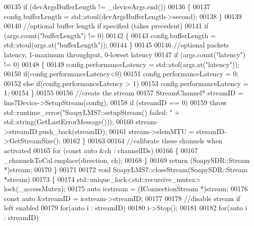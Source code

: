 \begin{DoxyCode}
00135         \textcolor{keywordflow}{if} (devArgsBufferLength != \_deviceArgs.end())
00136         \{
00137             config.bufferLength = std::stoul(devArgsBufferLength->second);
00138         \}
00139 
00140         \textcolor{comment}{//optional buffer length if specified (takes precedent)}
00141         \textcolor{keywordflow}{if} (args.count(\textcolor{stringliteral}{"bufferLength"}) != 0)
00142         \{
00143             config.bufferLength = std::stoul(args.at(\textcolor{stringliteral}{"bufferLength"}));
00144         \}
00145 
00146         \textcolor{comment}{//optional packets latency, 1-maximum throughput, 0-lowest latency}
00147         \textcolor{keywordflow}{if} (args.count(\textcolor{stringliteral}{"latency"}) != 0)
00148         \{
00149             config.performanceLatency = std::stof(args.at(\textcolor{stringliteral}{"latency"}));
00150             \textcolor{keywordflow}{if}(config.performanceLatency<0)
00151                 config.performanceLatency = 0;
00152             \textcolor{keywordflow}{else} \textcolor{keywordflow}{if}(config.performanceLatency > 1)
00153                 config.performanceLatency = 1;
00154         \}
00155 
00156         \textcolor{comment}{//create the stream}
00157         StreamChannel* streamID = lms7Device->SetupStream(config);
00158         \textcolor{keywordflow}{if} (streamID == 0)
00159             \textcolor{keywordflow}{throw} std::runtime\_error(\textcolor{stringliteral}{"SoapyLMS7::setupStream() failed: "} + 
      std::string(GetLastErrorMessage()));
00160         stream->streamID.push\_back(streamID);
00161         stream->elemMTU = streamID->GetStreamSize();
00162     \}
00163 
00164     \textcolor{comment}{//calibrate these channels when activated}
00165     \textcolor{keywordflow}{for} (\textcolor{keyword}{const} \textcolor{keyword}{auto} &ch : channelIDs)
00166     \{
00167         \_channelsToCal.emplace(direction, ch);
00168     \}
00169     \textcolor{keywordflow}{return} (SoapySDR::Stream *)stream;
00170 \}
00171 
00172 \textcolor{keywordtype}{void} SoapyLMS7::closeStream(SoapySDR::Stream *stream)
00173 \{
00174     std::unique\_lock<std::recursive\_mutex> lock(\_accessMutex);
00175     \textcolor{keyword}{auto} icstream = (IConnectionStream *)stream;
00176     \textcolor{keyword}{const} \textcolor{keyword}{auto} &streamID = icstream->streamID;
00177 
00178     \textcolor{comment}{//disable stream if left enabled}
00179     \textcolor{keywordflow}{for}(\textcolor{keyword}{auto} i : streamID)
00180         i->Stop();
00181 
00182     \textcolor{keywordflow}{for}(\textcolor{keyword}{auto} i : streamID)

\end{DoxyCode}
